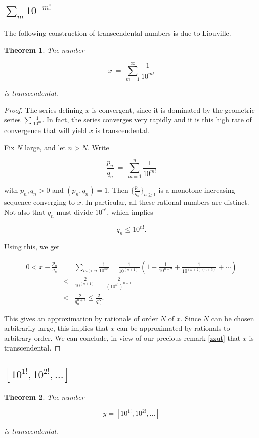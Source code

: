 \documentclass[12pt,letterpaper]{report}
\newcommand\be{\begin{equation}}
\newcommand\ee{\end{equation}}
\newcommand\bea{\begin{eqnarray}}
\newcommand\eea{\end{eqnarray}}
\newtheorem{thm}{Theorem}[section]
\newcommand{\pn}{p_n}
\newcommand{\qn}{q_n}
\begin{document}
\subsection{$\sum_m 10^{-m!}$}

The following construction of transcendental numbers is due to
Liouville.

\begin{thm}
The number

\be x\ = \ \sum_{m=1}^{\infty}\frac{1}{10^{m!}} \ee

is transcendental.
\end{thm}

\begin{proof}
The series defining $x$ is convergent, since it is dominated by
the geometric series $\sum\frac{1}{10^m}$. In fact, the series
converges very rapidly and it is this high rate of convergence
that will yield $x$ is transcendental.

Fix $N$ large, and let $n>N$. Write

\be \frac{\pn}{\qn} \ = \ \sum_{m=1}^n\frac{1}{10^{m!}} \ee

with $\pn,\qn>0$ and $(\pn,\qn)=1$. Then
$\{\frac{\pn}{\qn}\}_{n\geq 1}$ is a monotone increasing sequence
converging to $x$. In particular, all these rational numbers are
distinct. Not also that $\qn$ must divide $10^{n!}$, which implies

\be \qn\leq 10^{n!}. \ee

Using this, we get

\bea 0<x-\frac{\pn}{\qn}&=& \sum_{m>n}\frac{1}{10^{m!}}=
\frac{1}{10^{(n+1)!}}\left(1+\frac{1}{10^{n+2}}+
\frac{1}{10^{(n+2)(n+3)}}+\cdots\right)\nonumber\\
&<&\frac{2}{10^{(n+1)!}}=\frac{2}{(10^{n!})^{n+1}}\nonumber\\
&<&\frac{2}{\qn ^{n+1}}\leq \frac{2}{\qn ^N}. \eea

This gives an approximation by rationals of order $N$ of $x$.
Since $N$ can be chosen arbitrarily large, this implies that $x$
can be approximated by rationals to arbitrary order. We can
conclude, in view of our precious remark \ref{zzut} that $x$ is
transcendental.
\end{proof}


\subsection{$[10^{1!},10^{2!},\dots]$}

\begin{thm}

The number

\be y=[10^{1!},10^{2!},\dots] \ee

is transcendental.
\end{thm}
\end{document}
